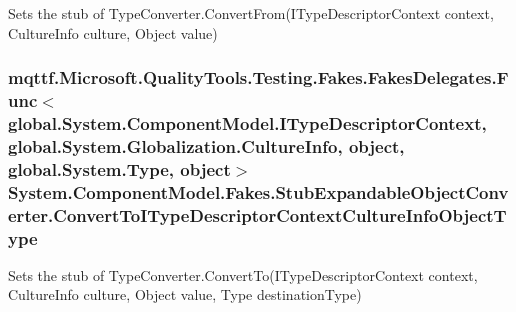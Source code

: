 Sets the stub of Type\-Converter.\-Convert\-From(\-I\-Type\-Descriptor\-Context context, Culture\-Info culture, Object value)

\hypertarget{class_system_1_1_component_model_1_1_fakes_1_1_stub_expandable_object_converter_a5889005273c7668e2304235e52242120}{
\subsubsection[{Convert\-To\-I\-Type\-Descriptor\-Context\-Culture\-Info\-Object\-Type}]{\setlength{\rightskip}{0pt plus 5cm}mqttf.\-Microsoft.\-Quality\-Tools.\-Testing.\-Fakes.\-Fakes\-Delegates.\-Func$<$global.\-System.\-Component\-Model.\-I\-Type\-Descriptor\-Context, global.\-System.\-Globalization.\-Culture\-Info, object, global.\-System.\-Type, object$>$ System.\-Component\-Model.\-Fakes.\-Stub\-Expandable\-Object\-Converter.\-Convert\-To\-I\-Type\-Descriptor\-Context\-Culture\-Info\-Object\-Type}}\label{class_system_1_1_component_model_1_1_fakes_1_1_stub_expandable_object_converter_a5889005273c7668e2304235e52242120}


Sets the stub of Type\-Converter.\-Convert\-To(\-I\-Type\-Descriptor\-Context context, Culture\-Info culture, Object value, Type destination\-Type)

